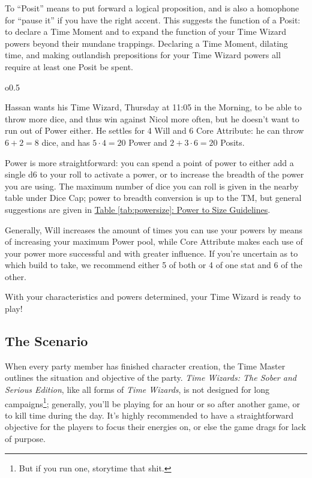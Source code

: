 \documentclass[twoside]{article}
\newcommand{\twsse}{\emph{Time Wizards: The Sober and Serious Edition}}
\newcommand{\tw}{\emph{Time Wizards}}
\newenvironment{examplebox}[1]{\begin{tcolorbox}[colback=green!5!white,colframe=green!75!black,title={Example: #1}]}{\end{tcolorbox}\vspace{-30pt}}
\begin{document}
To ``Posit'' means to put forward a logical proposition, and is also a homophone for ``pause
it'' if you have the right accent. This suggests the function of a Posit: to declare a Time
Moment and to expand the function of your Time Wizard powers beyond their mundane trappings.
Declaring a Time Moment, dilating time, and making outlandish prepositions for your Time Wizard
powers all require at least one Posit be spent.

\begin{wrapfigure}{o}{0.5\textwidth}
   \vspace{-10pt}
   \begin{examplebox}{Determining Characteristics}
      Hassan wants his Time Wizard, Thursday at 11:05 in the Morning, to be able to throw more
      dice, and thus win against Nicol more often, but he doesn't want to run out of Power
      either. He settles for 4 Will and 6 Core Attribute: he can throw $6+2=8$ dice, and has
      $5\cdot 4=20$ Power and $2+3\cdot 6=20$ Posits.
   \end{examplebox}
   \vspace{20pt}
\end{wrapfigure}

Power is more straightforward: you can spend a point of power to either add a single d6 to your
roll to activate a power, or to increase the breadth of the power you are using. The maximum
number of dice you can roll is given in the nearby table under Dice Cap; power to breadth
conversion is up to the TM, but general suggestions are given in
\hyperref[tab:powersize]{Table \ref*{tab:powersize}: Power to Size Guidelines}.

Generally, Will increases the amount of times you can use your powers by means of increasing
your maximum Power pool, while Core Attribute makes each use of your power more successful and
with greater influence. If you're uncertain as to which build to take, we recommend either 5
of both or 4 of one stat and 6 of the other.

With your characteristics and powers determined, your Time Wizard is ready to play!

\subsection{The Scenario} \label{ssec:scenario}
When every party member has finished character creation, the Time Master outlines the situation
and objective of the party. \twsse{}, like all forms of \tw{}, is not designed for long
campaigns\footnote{But if you run one, storytime that shit.}; generally, you'll be playing for
an hour or so after another game, or to kill time during the day. It's highly recommended to
have a straightforward objective for the players to focus their energies on, or else the game
drags for lack of purpose.
\end{document}
